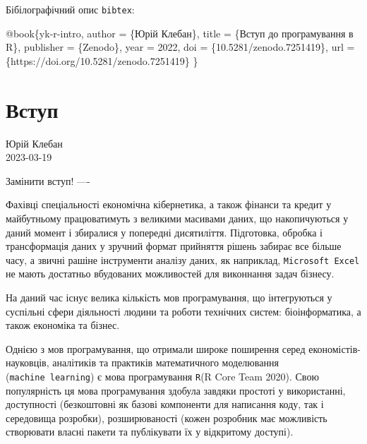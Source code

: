 \documentclass[
  letterpaper,
  DIV=11,
  numbers=noendperiod]{scrreprt}
\newenvironment{Shaded}{\begin{snugshade}}{\end{snugshade}}
\newcommand{\DataTypeTok}[1]{\textcolor[rgb]{0.68,0.00,0.00}{#1}}
\newcommand{\NormalTok}[1]{\textcolor[rgb]{0.00,0.23,0.31}{#1}}
\newcommand{\OtherTok}[1]{\textcolor[rgb]{0.00,0.23,0.31}{#1}}
\newcommand{\VariableTok}[1]{\textcolor[rgb]{0.07,0.07,0.07}{#1}}
\begin{document}
Бібілографічний опис \texttt{bibtex}:

\begin{Shaded}
\begin{Highlighting}[]
\VariableTok{@book}\NormalTok{\{}\OtherTok{yk}\NormalTok{{-}}\OtherTok{r}\NormalTok{{-}}\OtherTok{intro}\NormalTok{,}
  \DataTypeTok{author}\NormalTok{       = \{Юрій Клебан\},}
  \DataTypeTok{title}\NormalTok{        = \{Вступ до програмування в R\},}
  \DataTypeTok{publisher}\NormalTok{    = \{Zenodo\},}
  \DataTypeTok{year}\NormalTok{         = 2022,}
  \DataTypeTok{doi}\NormalTok{          = \{10.5281/zenodo.7251419\},}
  \DataTypeTok{url}\NormalTok{          = \{https://doi.org/10.5281/zenodo.7251419\}}
\NormalTok{\}}
\end{Highlighting}
\end{Shaded}


\hypertarget{ux432ux441ux442ux443ux43f}{%
\chapter*{Вступ}\label{ux432ux441ux442ux443ux43f}}

Юрій Клебан\\
2023-03-19

\hfill\break

Замінити вступ! ----

Фахівці спеціальності економічна кібернетика, а також фінанси та кредит
у майбутньому працюватимуть з великими масивами даних, що накопичуються
у даний момент і збиралися у попередні дисятиліття. Підготовка, обробка
і трансформація даних у зручний формат прийняття рішень забирає все
більше часу, а звичні рашіне інструменти аналізу даних, як наприклад,
\texttt{Microsoft\ Excel} не мають достатньо вбудованих можливостей для
виконнання задач бізнесу.

На даний час існує велика кількість мов програмування, що інтегруються у
суспільні сфери діяльності людини та роботи технічних систем:
біоінформатика, а також економіка та бізнес.

Однією з мов програмування, що отримали широке поширення серед
економістів-науковців, аналітиків та практиків математичного моделювання
(\texttt{machine\ learning}) є мова програмування \texttt{R}(R Core Team
2020). Свою популярність ця мова програмування здобула завдяки простоті
у використанні, доступності (безкоштовні як базові компоненти для
написання коду, так і середовища розробки), розширюваності (кожен
розробник має можливість створювати власні пакети та публікувати їх у
відкритому доступі).
\end{document}
